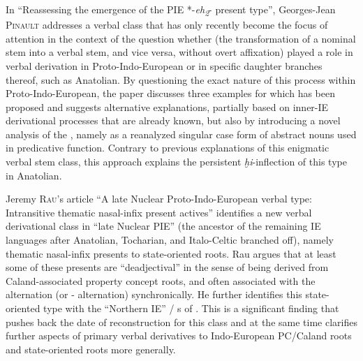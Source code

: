 \documentclass[output=paper,colorlinks,citecolor=brown]{langscibook}
\begin{document}
In ``Reassessing the emergence of the PIE *-\textit{eh\textsubscript{2}}- present type'', Georges-Jean \textsc{Pinault} addresses a verbal class that has only recently become the focus of attention in the context of the question whether  (the transformation of a nominal stem into a verbal stem, and vice versa, without overt affixation) played a role in verbal derivation in Proto-Indo-European or in specific daughter branches thereof, such as Anatolian. By questioning the exact nature of this process within Proto-Indo-European, the paper discusses three examples for which  has been proposed and suggests alternative explanations, partially based on inner-IE derivational processes that are already known, but also by introducing a novel analysis of the , namely as a reanalyzed  singular case form of abstract nouns used in predicative function. Contrary to previous explanations of this enigmatic verbal stem class, this approach explains the persistent \textit{ḫi}-inflection of this type in Anatolian. 


Jeremy \textsc{Rau}'s article ``A late Nuclear Proto-Indo-European verbal type: Intransitive thematic nasal-infix  present actives''  identifies a new verbal derivational class in ``late Nuclear PIE'' (the ancestor of the remaining IE languages after Anatolian, Tocharian, and Italo-Celtic branched off), namely thematic nasal-infix presents  to state-oriented roots. Rau argues that at least some of these presents are ``deadjectival'' in the sense of being derived from Caland-associated  property concept roots, and often associated with the  alternation (or - alternation) synchronically. He further identifies this  state-oriented type with the ``Northern IE'' /  s of \citet{Gorbachov2007}. This is a significant finding that pushes back the date of reconstruction for this class and at the same time clarifies further aspects of primary verbal derivatives  to Indo-European PC/Caland roots and state-oriented roots more generally. 
\end{document}
